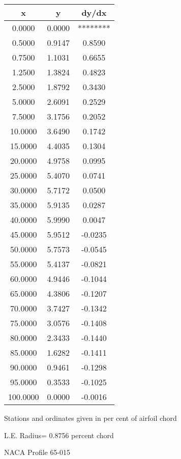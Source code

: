 \documentclass[11pt]{book}
\begin{document}
 \vspace{8mm}
 \begin{tabular}{|c|c|c|} \hline 
  x  &  y  &  dy/dx \\
 \hline
0.0000 & 0.0000 & ******** \\
0.5000 & 0.9147 & 0.8590 \\
0.7500 & 1.1031 & 0.6655 \\
1.2500 & 1.3824 & 0.4823 \\
2.5000 & 1.8792 & 0.3430 \\
5.0000 & 2.6091 & 0.2529 \\
7.5000 & 3.1756 & 0.2052 \\
10.0000 & 3.6490 & 0.1742 \\
15.0000 & 4.4035 & 0.1304 \\
20.0000 & 4.9758 & 0.0995 \\
25.0000 & 5.4070 & 0.0741 \\
30.0000 & 5.7172 & 0.0500 \\
35.0000 & 5.9135 & 0.0287 \\
40.0000 & 5.9990 & 0.0047 \\
45.0000 & 5.9512 & -0.0235 \\
50.0000 & 5.7573 & -0.0545 \\
55.0000 & 5.4137 & -0.0821 \\
60.0000 & 4.9446 & -0.1044 \\
65.0000 & 4.3806 & -0.1207 \\
70.0000 & 3.7427 & -0.1342 \\
75.0000 & 3.0576 & -0.1408 \\
80.0000 & 2.3433 & -0.1440 \\
85.0000 & 1.6282 & -0.1411 \\
90.0000 & 0.9461 & -0.1298 \\
95.0000 & 0.3533 & -0.1025 \\
100.0000 & 0.0000 & -0.0016 \\
 \hline
 \end{tabular}
 \vspace{8mm}


Stations and ordinates given in per cent of airfoil chord 


L.E. Radius=  0.8756 percent chord
 \newpage
  \label{p65-015}
 \begin{Large}
 NACA Profile 65-015
 \end{Large}
  
\end{document}

